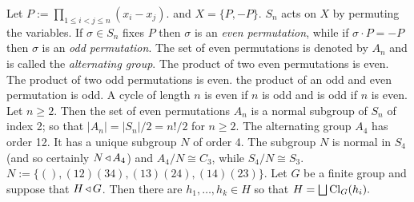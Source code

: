  Let 
$P := \prod_{1 \le i < j \le n}(x_i-x_j).$ 
and $X = \{P,-P\}$. $S_n$ acts on $X$ by permuting the variables.
If $\sigma \in S_n$ fixes $P$ then $\sigma$ is an \textit{even permutation}, while if $\sigma \cdot P = -P$ then $\sigma$ is an \emph{odd permutation}. The set of even permutations is denoted by $A_n$ and is called the \emph{alternating group}.
 The product of two even permutations is even. The product of two odd permutations is even. the product of an odd and even permutation is odd. A cycle of length $n$ is even if $n$ is odd and is odd if $n$ is even.
 Let $n \ge 2$. Then the set of even permutations $A_n$ is a normal subgroup of $S_n$ of index 2; so that $|A_n| = |S_n|/2 = n!/2$ for $n \ge 2$.
 The alternating group $A_4$ has order 12. It has a unique subgroup $N$ of order 4. The subgroup $N$ is normal in $S_4$ (and so certainly $N \operatorname{\triangleleft} A_4$) and $A_4/N \cong C_3$, while $S_4/N \cong S_3$. $N := \{(), (12)(34), (13)(24), (14)(23)\}$.
 Let $G$ be a finite group and suppose that $H \operatorname{\triangleleft} G$. Then there are $h_1, \ldots, h_k \in H$ so that $H = \bigsqcup\operatorname{Cl}_G(h_i).$